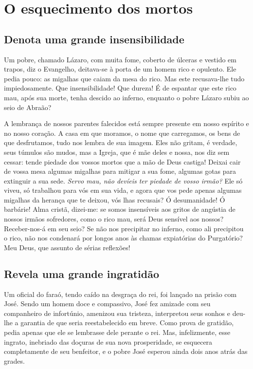\renewcommand{\thechapterdisplay}{Décimo quinto dia}
\renewcommand{\thechapterrunner}{O esquecimento dos mortos}
\chapter[Décimo quinto dia --- O esquecimento dos mortos]{O esquecimento dos mortos}
\section*{Denota uma grande insensibilidade}

Um pobre, chamado Lázaro, com muita fome, coberto de úlceras e vestido em trapos, diz o Evangelho, deitava-se à porta de um homem rico e opulento. Ele pedia pouco: as migalhas que caiam da mesa do rico. Mas este recusava-lhe tudo impiedosamente. Que insensibilidade! Que dureza! É de espantar que este rico mau, após sua morte, tenha descido ao inferno, enquanto o pobre Lázaro subiu ao seio de Abraão? 

A lembrança de nossos parentes falecidos está sempre presente em nosso espírito e no nosso coração. A casa em que moramos, o nome que carregamos, os bens de que desfrutamos, tudo nos lembra de sua imagem. Eles não gritam, é verdade, seus túmulos são mudos, mas a Igreja, que é mãe deles e nossa, nos diz sem cessar: tende piedade dos vossos mortos que a mão de Deus castiga! Deixai cair de vossa mesa algumas migalhas para mitigar a sua fome, algumas gotas para extinguir a sua sede. \textit{Servo mau, não devíeis ter piedade de vosso irmão?} Ele só viveu, só trabalhou para vós em sua vida, e agora que vos pede apenas algumas migalhas da herança que te deixou, vós lhas recusais? Ó desumanidade! Ó barbárie! Alma cristã, dizei-me: se somos insensíveis aos gritos de angústia de nossos irmãos sofredores, como o rico mau, será Deus sensível aos nossos? Receber-nos-á em seu seio? Se não nos precipitar no inferno, como ali precipitou o rico, não nos condenará por longos anos às chamas expiatórias do Purgatório? Meu Deus, que assunto de sérias reflexões!


\section*{Revela uma grande ingratidão}

Um oficial do faraó, tendo caído na desgraça do rei, foi lançado na prisão com José. Sendo um homem doce e compassivo, José fez amizade com seu companheiro de infortúnio, amenizou sua tristeza, interpretou seus sonhos e deu-lhe a garantia de que seria reestabelecido em breve. Como prova de gratidão, pedia apenas que ele se lembrasse dele perante o rei. Mas, infelizmente, esse ingrato, inebriado das doçuras de sua nova prosperidade, se esquecera completamente de seu benfeitor, e o pobre José esperou ainda dois anos atrás das grades.

